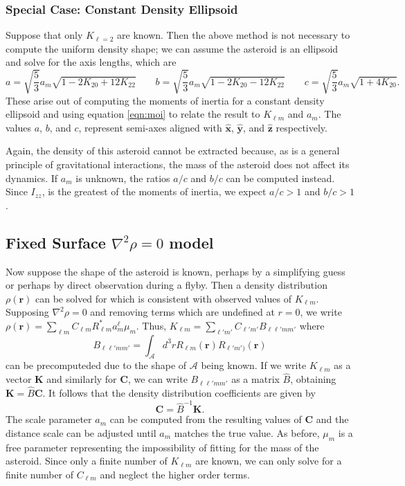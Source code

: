 \documentclass[linenumbers]{aastex631}
\newcommand{\unit}[1]{\hat{\mathbf{#1}}}
\begin{document}
\subsubsection{Special Case: Constant Density Ellipsoid}
\label{sec:constant-density-ellipsoid}
Suppose that only $K_{\ell = 2}$ are known. Then the above method is not necessary to compute the uniform density shape; we can assume the asteroid is an ellipsoid and solve for the axis lengths, which are
\begin{equation}
a = \sqrt{\frac{5}{3}}a_m\sqrt{1-2K_{20}+12K_{22}} \qquad b = \sqrt{\frac{5}{3}}a_m\sqrt{1-2K_{20}-12K_{22}} \qquad c = \sqrt{\frac{5}{3}}a_m\sqrt{1+4K_{20}}.
\label{eqn:ellipsoid-klm}
\end{equation}
These arise out of computing the moments of inertia for a constant density ellipsoid and using equation \ref{eqn:moi} to relate the result to $K_{\ell m}$ and $a_m$. The values $a$, $b$, and $c$, represent semi-axes aligned with $\unit x$, $\unit y$, and $\unit z$ respectively.

Again, the density of this asteroid cannot be extracted because, as is a general principle of gravitational interactions, the mass of the asteroid does not affect its dynamics. If $a_m$ is unknown, the ratios $a/c$ and $b/c$ can be computed instead. Since $I_{zz}$, is the greatest of the moments of inertia, we expect $a/c > 1$ and $b/c > 1$. 

\subsection{Fixed Surface $\nabla^2 \rho = 0$ model}
Now suppose the shape of the asteroid is known, perhaps by a simplifying guess or perhaps by direct observation during a flyby. Then a density distribution $\rho(\mathbf r)$ can be solved for which is consistent with observed values of $K_{\ell m}$. Supposing $\nabla^2 \rho = 0$ and removing terms which are undefined at $r=0$, we write $\rho(\mathbf r) = \sum_{\ell m} C_{\ell m} R_{\ell m}^* a_m^\ell \mu_m$. Thus, $K_{\ell m} = \sum_{\ell' m'} C_{\ell' m'} B_{\ell \ell' m m'}$ where
\begin{equation}
  B_{\ell \ell' m m'} = \int_{\mathcal{A}}d^3 r R_{\ell m}(\mathbf r) R_{\ell' m')}(\mathbf r)
  \label{eqn:blm}
\end{equation}
can be precomputeded due to the shape of $\mathcal{A}$ being known.
If we write $K_{\ell m}$ as a vector $\mathbf K$ and similarly for $\mathbf C$, we can write $B_{\ell \ell' m m'}$ as a matrix $\hat B$, obtaining $\mathbf K = \hat B \mathbf C$. It follows that the density distribution coefficients are given by
\begin{equation}
\mathbf C = \hat B^{-1} \mathbf K.
\end{equation}
The scale parameter $a_m$ can be computed from the resulting values of $\mathbf C$ and the distance scale can be adjusted until $a_m$ matches the true value. As before, $\mu_m$ is a free parameter representing the impossibility of fitting for the mass of the asteroid. Since only a finite number of $K_{\ell m}$ are known, we can only solve for a finite number of $C_{\ell m}$ and neglect the higher order terms.
\end{document}
